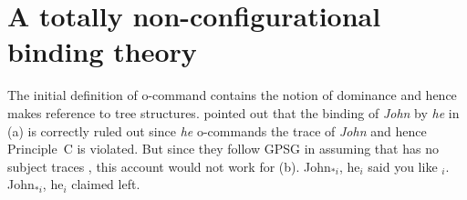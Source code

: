 \documentclass[output=paper,biblatex,babelshorthands,newtxmath,draftmode,colorlinks,citecolor=brown]{langscibook}
\begin{document}
\section{A totally non-configurational binding theory}
\label{sec-totally-non-configurational-BT}

The initial definition of o-command contains the notion of dominance and hence makes reference to
tree structures. \citet[]{ps2} pointed out that the binding of \emph{John} by \emph{he} in
(a) is correctly ruled out since \emph{he} o-commands the trace of \emph{John} and hence
Principle~C is violated. But since they follow GPSG in assuming that  has no subject traces
\citep[Chapter~4.4]{ps2}, this account would not work for (b). 
\eal
\label{ex-subject-object-extraction-traceless}
\ex John$_{*i}$, he$_i$ said you like \trace$_i$.
\ex John$_{*i}$, he$_i$ claimed left.
\zl
\end{document}
